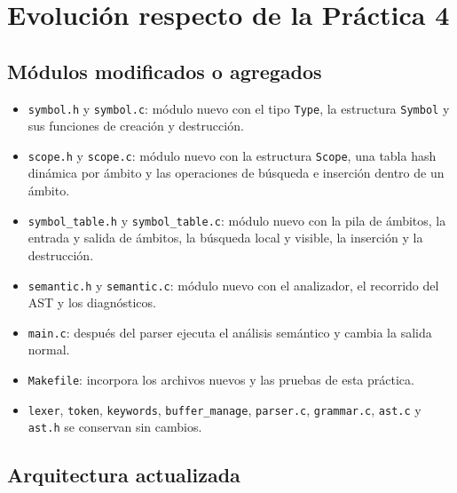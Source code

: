 \documentclass[12pt,letterpaper]{article}
\begin{document}
\bigskip

\section*{Evolución respecto de la Práctica 4}

\subsection*{Módulos modificados o agregados}

\begin{itemize}
\item \texttt{symbol.h} y \texttt{symbol.c}: módulo nuevo con el tipo \texttt{Type}, la estructura
  \texttt{Symbol} y sus funciones de creación y destrucción.
  
\item \texttt{scope.h} y \texttt{scope.c}: módulo nuevo con la estructura \texttt{Scope}, una tabla hash
  dinámica por ámbito y las operaciones de búsqueda e inserción dentro de un ámbito.
  
\item \texttt{symbol\_table.h} y \texttt{symbol\_table.c}: módulo nuevo con la pila de ámbitos, la entrada y
  salida de ámbitos, la búsqueda local y visible, la inserción y la destrucción.
  
\item \texttt{semantic.h} y \texttt{semantic.c}: módulo nuevo con el analizador, el recorrido del AST y los
  diagnósticos.
  
\item \texttt{main.c}: después del parser ejecuta el análisis semántico y cambia la salida normal.
  
\item \texttt{Makefile}: incorpora los archivos nuevos y las pruebas de esta práctica.
  
\item \texttt{lexer}, \texttt{token}, \texttt{keywords}, \texttt{buffer\_manage}, \texttt{parser.c},
  \texttt{grammar.c}, \texttt{ast.c} y \texttt{ast.h} se conservan sin cambios.
\end{itemize}

\subsection*{Arquitectura actualizada}
\end{document}
